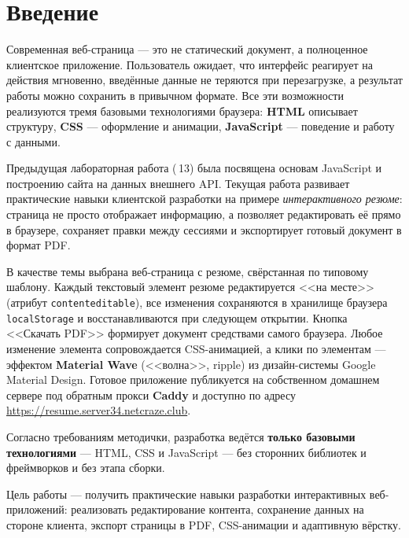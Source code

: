 \chapter*{Введение}
\label{ch:intro}

Современная веб-страница --- это не статический документ, а полноценное
клиентское приложение. Пользователь ожидает, что интерфейс реагирует на
действия мгновенно, введённые данные не теряются при перезагрузке, а
результат работы можно сохранить в привычном формате. Все эти возможности
реализуются тремя базовыми технологиями браузера: \textbf{HTML} описывает
структуру, \textbf{CSS} --- оформление и анимации, \textbf{JavaScript} ---
поведение и работу с данными.

Предыдущая лабораторная работа (\textnumero\,13) была посвящена основам
JavaScript и построению сайта на данных внешнего API. Текущая работа
развивает практические навыки клиентской разработки на примере
\textit{интерактивного резюме}: страница не просто отображает информацию,
а позволяет редактировать её прямо в браузере, сохраняет правки между
сессиями и экспортирует готовый документ в формат PDF.

В качестве темы выбрана веб-страница с резюме, свёрстанная по типовому
шаблону. Каждый текстовый элемент резюме редактируется <<на месте>>
(атрибут \texttt{contenteditable}), все изменения сохраняются в хранилище
браузера \texttt{localStorage} и восстанавливаются при следующем открытии.
Кнопка <<Скачать PDF>> формирует документ средствами самого браузера. Любое
изменение элемента сопровождается CSS-анимацией, а клики по элементам ---
эффектом \textbf{Material Wave} (<<волна>>, ripple) из дизайн-системы
Google Material Design. Готовое приложение публикуется на собственном
домашнем сервере под обратным прокси \textbf{Caddy} и доступно по адресу
\url{https://resume.server34.netcraze.club}.

Согласно требованиям методички, разработка ведётся \textbf{только базовыми
технологиями} --- HTML, CSS и JavaScript --- без сторонних библиотек и
фреймворков и без этапа сборки.

Цель работы --- получить практические навыки разработки интерактивных
веб-приложений: реализовать редактирование контента, сохранение данных на
стороне клиента, экспорт страницы в PDF, CSS-анимации и адаптивную вёрстку.

